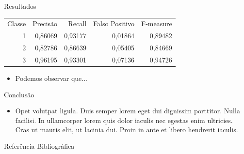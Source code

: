 \documentclass[final,hyperref={pdfpagelabels=false, brazil}]{beamer}
\begin{document}
\begin{frame}[t]
\begin{columns}[t]
\begin{column}{.465\textwidth}
\begin{block}{Resultados}
\begin{itemize}
\begin{tabular}{ r r r r r }

  Classe & Precisão & Recall  & Falso Positivo & F-measure  \\
    1    & 0,86069  & 0,93177 & 0,01864        & 0,89482    \\
    2    & 0,82786  & 0,86639 & 0,05405        & 0,84669    \\
    3    & 0,96195  & 0,93301 & 0,07136        & 0,94726
\end{tabular}
\end{itemize}

\begin{itemize}
\item Podemos observar que...

\end{itemize}

\end{block}


\begin{block}{Conclus\~ao}

\begin{itemize}
\item Opet volutpat ligula. Duis semper lorem eget dui dignissim porttitor. Nulla facilisi. In ullamcorper lorem quis dolor iaculis nec egestas enim ultricies. Cras ut mauris elit, ut lacinia dui. Proin in ante et libero hendrerit iaculis.




\end{itemize}

\end{block}


\begin{block}{Refer\^encia Bibliogr\'afica}
        
\nocite{*} %
\small{
}

\end{block}




\end{column}
\end{columns}
\end{frame}
\end{document}
